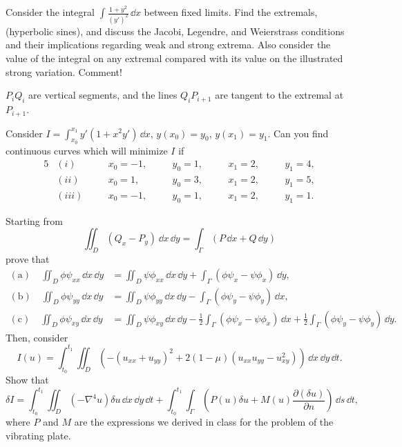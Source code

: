 \begin{Exercise}
  Consider the integral $\int \frac{1 + y^2}{(y')^2} \,\dd x$ between fixed
  limits.  Find the extremals, (hyperbolic sines), and discuss the Jacobi,
  Legendre, and Weierstrass conditions and their implications regarding
  weak and strong extrema.  Also consider the value of the integral
  on any extremal compared with its value on the illustrated strong variation.
  Comment!

  $P_i Q_i$ are vertical segments, and the lines $Q_i P_{i+1}$ are tangent
  to the extremal at $P_{i+1}$.
\end{Exercise}



\begin{Exercise}
  Consider $I = \int_{x_0}^{x_1} y' (1 + x^2 y') \,\dd x$, $y(x_0) = y_0$,
  $y(x_1) = y_1$.  Can you find continuous curves which will minimize $I$ if
  \begin{alignat*}{5}
    &(i) &\quad &x_0 = -1, &\quad &y_0 = 1, &\quad &x_1 = 2, &\quad &y_1 = 4, \\
    &(ii) &\quad &x_0 = 1, &\quad &y_0 = 3, &\quad &x_1 = 2, &\quad &y_1 = 5, \\
    &(iii) &\quad &x_0 = -1, &\quad &y_0 = 1, &\quad &x_1 = 2, &\quad &y_1 = 1. 
  \end{alignat*}
\end{Exercise}



\begin{Exercise}
  Starting from 
  \[
  \iint_D (Q_x - P_y) \,\dd x\,\dd y = \int_\Gamma (P \,\dd x + Q\,\dd y)
  \]
  prove that
  \begin{align*}
    (\mathrm{a}) \quad \iint_D \phi \psi_{x x} \,\dd x \,\dd y
    &= \iint_D \psi \phi_{x x} \,\dd x \,\dd y
    + \int_\Gamma (\phi \psi_x - \psi \phi_x ) \,\dd y, \\
    (\mathrm{b}) \quad \iint_D \phi \psi_{y y} \,\dd x \,\dd y
    &= \iint_D \psi \phi_{y y} \,\dd x \,\dd y
    - \int_\Gamma (\phi \psi_y - \psi \phi_y ) \,\dd x, \\
    (\mathrm{c}) \quad \iint_D \phi \psi_{x y} \,\dd x \,\dd y
    &= \iint_D \psi \phi_{x y} \,\dd x \,\dd y
    - \frac{1}{2} \int_\Gamma (\phi \psi_x - \psi \phi_x ) \,\dd x 
    + \frac{1}{2} \int_\Gamma (\phi \psi_y - \psi \phi_y ) \,\dd y. 
  \end{align*}
  Then, consider
  \[
  I(u) = \int_{t_0}^{t_1} \iint_D \left( - (u_{x x} + u_{y y})^2 
    + 2 (1 - \mu) (u_{x x} u_{y y} - u_{x y}^2 ) \right) \,\dd x \,\dd y\,\dd t.
  \]
  Show that
  \[
  \delta I = \int_{t_0}^{t_1} \iint_D (- \nabla^4 u) \delta u \,\dd x\,\dd y\,\dd t
  + \int_{t_0}^{t_1} \int_\Gamma \left( P(u) \delta u + M(u)
    \frac{\partial (\delta u)}{\partial n} \right) \,\dd s\,\dd t,
  \]
  where $P$ and $M$ are the expressions we derived in class for the 
  problem of the vibrating plate.
\end{Exercise}


